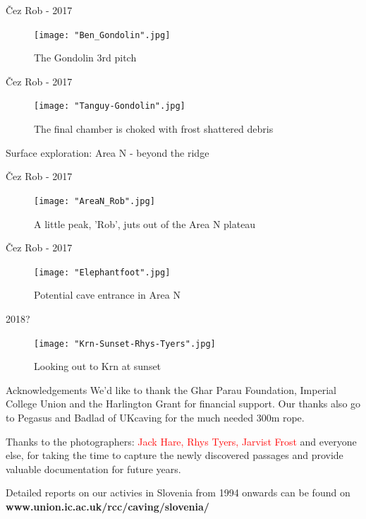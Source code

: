 \documentclass[10pt]{beamer}
\begin{document}
\begin{frame}{Čez Rob - 2017}
    \begin{figure}[!ht]
    \centering
    \texttt{[image: "Ben\_Gondolin".jpg]}
    \caption{The Gondolin 3rd pitch}
    \end{figure}
\end{frame} 

\begin{frame}{Čez Rob - 2017}
    \begin{figure}[!ht]
    \centering
    \texttt{[image: "Tanguy-Gondolin".jpg]}
    \caption{The final chamber is choked with frost shattered debris}
    \end{figure}
\end{frame} 

\begin{frame}[standout]
Surface exploration: Area N - beyond the ridge
\end{frame}

\begin{frame}{Čez Rob - 2017}
    \begin{figure}[!ht]
    \centering
    \texttt{[image: "AreaN\_Rob".jpg]}
    \caption{A little peak, 'Rob', juts out of the Area N plateau }
    \end{figure}
\end{frame}

\begin{frame}{Čez Rob - 2017}
    \begin{figure}[!ht]
    \centering
    \texttt{[image: "Elephantfoot".jpg]}
    \caption{Potential cave entrance in Area N}
    \end{figure}
\end{frame}
 
\begin{frame}{2018?}
    \begin{figure}[!ht]
    \centering
    \texttt{[image: "Krn-Sunset-Rhys-Tyers".jpg]}
    \caption{Looking out to Krn at sunset}
    \end{figure}
\end{frame}
\begin{frame}{Acknowledgements}
We'd like to thank the Ghar Parau Foundation, Imperial College Union and the Harlington Grant for financial support. Our thanks also go to Pegasus and Badlad of UKcaving for the much needed 300m rope.

Thanks to the photographers: \textcolor{red}{Jack Hare, Rhys Tyers, Jarvist Frost} and everyone else, for taking the time to capture the newly discovered passages and provide valuable documentation for future years.

Detailed reports on  our activies in Slovenia from 1994 onwards can be found on \textbf{www.union.ic.ac.uk/rcc/caving/slovenia/}

\end{frame}
\end{document}
